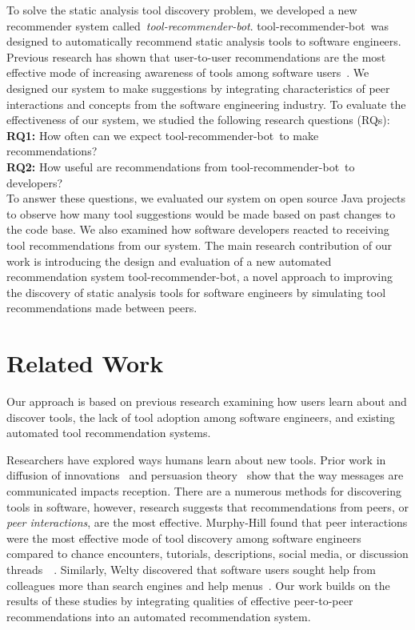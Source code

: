 \documentclass[conference]{IEEEtran}
\newcommand{\tool}{tool-recommender-bot}
\begin{document}
To solve the static analysis tool discovery problem, we developed a new recommender system called~\textit{\tool}. \tool~was designed to automatically recommend static analysis tools to software engineers. Previous research has shown that user-to-user recommendations are the most effective mode of increasing awareness of tools among software users~\cite{MurphyHill2011PeerInteraction}. We designed our system to make suggestions by integrating characteristics of peer interactions and concepts from the software engineering industry. To evaluate the effectiveness of our system, we studied the following research questions (RQs): \\

\noindent
\textbf{RQ1:} How often can we expect \tool~to make recommendations?  \\
\textbf{RQ2:} How useful are recommendations from \tool~to developers?  \\

To answer these questions, we evaluated our system on open source Java projects to observe how many tool suggestions would be made based on past changes to the code base. We also examined how software developers reacted to receiving tool recommendations from our system. The main research contribution of our work is introducing the design and evaluation of a new automated recommendation system \tool, a novel approach to improving the discovery of static analysis tools for software engineers by simulating tool recommendations made between peers.

\section{Related Work}

Our approach is based on previous research examining how users learn about and discover tools, the lack of tool adoption among software engineers, and existing automated tool recommendation systems.

Researchers have explored ways humans learn about new tools. Prior work in diffusion of innovations~\cite{Rogers2003Diffusion} and persuasion theory~\cite{Shen2012Persuasion} show that the way messages are communicated impacts reception. There are a numerous methods for discovering tools in software, however, research suggests that recommendations from peers, or \textit{peer interactions}, are the most effective. Murphy-Hill found that peer interactions were the most effective mode of tool discovery among software engineers compared to chance encounters, tutorials, descriptions, social media, or discussion threads~\cite{MurphyHill2011PeerInteraction}~\cite{Murphy-Hill2015HowDoUsers}. Similarly, Welty discovered that software users sought help from colleagues more than search engines and help menus~\cite{Welty2011Help}. Our work builds on the results of these studies by integrating qualities of effective peer-to-peer recommendations into an automated recommendation system.
\end{document}
